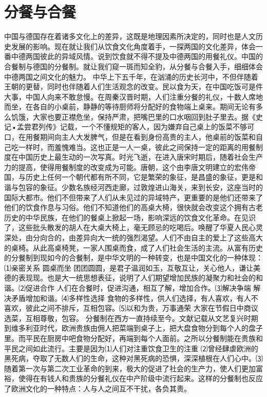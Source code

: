 \section{分餐与合餐}
中国与德国存在着诸多文化上的差异，这既是地理因素所决定的，同时也是人文历史发展的影响。现在就让我们从饮食文化角度着手，一探两国的文化差异，体会一番中德两国彼此的异域风情。说到饮食就不得不提及中德两国的用餐礼仪。中国的合餐制与德国的分餐制。就让我们窥一斑而知全豹，从分餐与合餐入手，细细体会中德两国之间文化的魅力。
     中华上下五千年，在汹涌的历史长河中，不但伴随着王朝的更替，同时也伴随着人们生活观念的改变。民以食为天，在中国吃饭可是件大事，中国人向来不敢怠慢。在周秦汉晋时期，人们注重分餐的礼仪，十数人席地而坐，在各自的小桌前，静静的等待厨师将分配好的食物端上桌来。期间无论有多么饥饿，大家也要正襟危坐，保持严肃，把嘴巴里的口水咽回到肚子里去。据《史记•孟尝君列传》记载，一个不懂规矩的客人，因为嫌弃自己桌上的饭菜不够可口，在用餐期间向主人大发脾气，但是在看到身份高贵的主人，他桌前的饭菜和自己吃一样时，而羞愧难当。这也正是一人一桌，彼此之间保持一定的距离的用餐制度在中国历史上最生动的一次写真。时光飞逝，在进入唐宋时期后，随着社会生产力的提高，使得用餐制度的改变成为可能。唐朝，这个由李唐文明建立的宏伟帝国，与历史上任何一个朝代都有所不同，它是繁荣的象征，是昌盛的象征，更是和谐与包容的象征。少数名族经河西走廊，过敦煌进山海关，来到长安，这座当时的国际大都市。他们不但带来了人们从未见过的异域特产，更重要的是他们还带来了他们的饮食作息与习俗。他们不知道他们的高桌大椅，很快就会改变这个拥有古老历史的中华民族，在他们的餐桌上掀起一场，影响深远的饮食文化革命。在见识了，这些批头散发的胡人在大桌大椅上，毫无顾忌的吃喝后。唤醒了华夏人民心灵深处，由分向合的，由差异向大一统的强烈渴望。人们不由自主的爱上了这些高大的桌椅。从此高桌椅凳，一家人围桌而食，成了人们社会生活的主流。从富有历史的分餐制到现如今的合餐制，是中华文明的一种转变，也是中国文化的一种体现：⑴亲密关系  圆桌而坐 团团圆圆，是君子温润如玉，互敬互让，关心他人，谦让美德的表现现。也是大一统思想表征，说明了人们期望增加民族的凝聚力和社会的和谐。⑵促进合作  人们在合餐时，促进沟通，相互了解，增加合作。⑶解决争端  解决矛盾增加和谐。⑷多样性选择  食物的多样性，供人们选择，有人喜欢，有人不喜欢，彼此之间不排斥，互相包容。⑸以和为贵，万事通荣 大家在节假日中商议选菜，互相尊敬，包容。
分餐制在西方一直持续至今。文献记载从文艺复兴时期到维多利亚时代，欧洲贵族由佣人把菜端到桌子上，把大盘食物分到每个人的盘子里。而平民在厨房中吧食物分配好，再端到每个人面前。之所以分餐制能在贵族和平民之间如此流行。主要是因为⑴人们对注重饮食卫生的注重 ⑵曾经肆虐欧洲的黑死病，夺取了无数人们的生命，这种对黑死病的恐惧，深深植根在人们心中。⑶随着第一次与第二次工业革命的到来，极大的促进了社会的生产力，使人们更加富裕，使得在有钱人和贵族的分餐礼仪在中产阶级中流行起来。这样的分餐制也反应了欧洲文化的一种特点：人与人之间互不干扰，各负其责。
